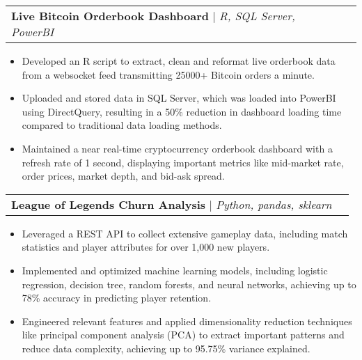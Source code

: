 \documentclass[letterpaper,11pt]{article}
\makeatletter
\newcommand{\resumeItem}[1]{
  \item\small{
    {#1 \vspace{-2pt}}
  }
}
\newcommand{\resumeProjectHeading}[2]{
    \item
    \begin{tabular*}{0.97\textwidth}{l@{\extracolsep{\fill}}r}
      \small#1 & #2 \\
    \end{tabular*}\vspace{-7pt}
}
\newcommand{\resumeItemListStart}{\begin{itemize}}
\newcommand{\resumeItemListEnd}{\end{itemize}\vspace{-5pt}}
\makeatother
\begin{document}
    \resumeProjectHeading
        {\textbf{Live Bitcoin Orderbook Dashboard} $|$ \emph{R, SQL Server, PowerBI}}{}
        \resumeItemListStart
            \resumeItem{Developed an R script to extract, clean and reformat live orderbook data from a websocket 
            feed transmitting 25000+ Bitcoin orders a minute.}
            \resumeItem{Uploaded and stored data in SQL Server, which was loaded into PowerBI 
            using DirectQuery, resulting in a 50\% reduction in dashboard loading time compared to traditional data loading methods.}
            \resumeItem{Maintained a near real-time cryptocurrency orderbook dashboard with a refresh rate of 1 second, 
            displaying important metrics like mid-market rate, order prices, market depth, 
            and bid-ask spread.}
        \resumeItemListEnd

        \resumeProjectHeading
        {\textbf{League of Legends Churn Analysis} $|$ \emph{Python, pandas, sklearn}}{}
        \resumeItemListStart
            \resumeItem{Leveraged a REST API to collect extensive gameplay data, 
            including match statistics and player attributes for over 1,000 new players.}
            \resumeItem{Implemented and optimized machine learning models, including logistic 
            regression, decision tree, random forests, and neural networks, achieving up to 78\% accuracy in predicting player retention.}
            \resumeItem{Engineered relevant features and applied dimensionality reduction techniques like principal component analysis 
            (PCA) to extract important patterns and reduce data complexity, achieving up to 95.75\% variance explained.}
          \resumeItemListEnd

\end{document}
